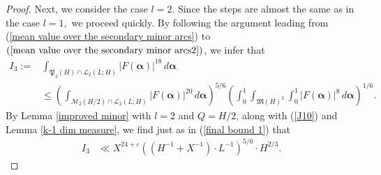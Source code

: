 \documentclass{amsart}%
\numberwithin{equation}{section}
\theoremstyle{remark}
\newcommand{\1}{\mathbbm{1}}
\newcommand{\balp}{\boldsymbol{\alpha}}
\begin{document}
\begin{proof}
Next, we consider the case $l=2$. Since the steps are almost the same as in the case $l=1,$ we proceed quickly.  
By following the argument leading from (\ref{mean value over the secondary minor arcs}) to $(\ref{mean value over the secondary minor arcs2})$, we infer that
\begin{equation*}
\begin{aligned}
 I_3 :=&  \int_{\mathfrak{P}_2(H)\cap \mathcal{L}_{2}(L;H)}|F(\boldsymbol{\alpha})|^{18}\, d\balp \\ &\le \left(\int_{\mathcal{M}_2(H/2)\cap \mathcal{L}_{2}(L;H)}|F(\boldsymbol{\alpha})|^{20}\, d\balp \right)^{5/6} \left(\int_0^1 \int_{\mathfrak{M}(H)^2} \int_0^1 |F(\boldsymbol{\alpha})|^{8}\, d\balp\right)^{1/6}.
\end{aligned}
\end{equation*}
By Lemma \ref{improved minor} with $l=2$ and $Q=H/2$, along with (\ref{J10}) and Lemma \ref{k-1 dim measure}, we find just as in (\ref{final bound 1}) that
\begin{equation}\label{final bound 3}
    \begin{aligned}
   I_3 & \ll X^{24+\varepsilon}\left(\left(H^{-1}+X^{-1}\right)\cdot L^{-1}\right)^{5/6}\cdot H^{2/3}.
    \end{aligned}
\end{equation}


\end{proof}
\end{document}
